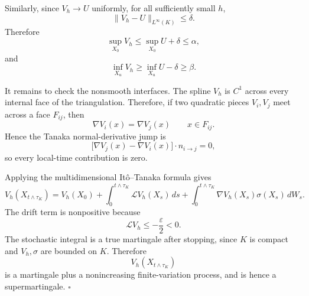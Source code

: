 Similarly, since \(V_h\to U\) uniformly, for all sufficiently small \(h\),
\[
  \|V_h-U\|_{L^\infty(K)}\le\delta.
\]
Therefore
\[
  \sup_{X_0}V_h
  \le
  \sup_{X_0}U+\delta
  \le
  \alpha,
\]
and
\[
  \inf_{X_u}V_h
  \ge
  \inf_{X_u}U-\delta
  \ge
  \beta.
\]

It remains to check the nonsmooth interfaces.  The spline \(V_h\) is
\(C^1\) across every internal face of the triangulation.  Therefore, if two
quadratic pieces \(V_i,V_j\) meet across a face \(F_{ij}\), then
\[
  \nabla V_i(x)=\nabla V_j(x)
  \qquad x\in F_{ij}.
\]
Hence the Tanaka normal-derivative jump is
\[
  \bigl[\nabla V_j(x)-\nabla V_i(x)\bigr]\cdot n_{i\to j}=0,
\]
so every local-time contribution is zero.

Applying the multidimensional It\^o--Tanaka formula gives
\[
  V_h(X_{t\wedge\tau_K})
  =
  V_h(X_0)
  +
  \int_0^{t\wedge\tau_K}\mathcal LV_h(X_s)\,ds
  +
  \int_0^{t\wedge\tau_K}\nabla V_h(X_s)\sigma(X_s)\,dW_s.
\]
The drift term is nonpositive because
\[
  \mathcal LV_h\le-\frac{\varepsilon}{2}<0.
\]
The stochastic integral is a true martingale after stopping, since \(K\) is
compact and \(V_h,\sigma\) are bounded on \(K\).  Therefore
\[
  V_h(X_{t\wedge\tau_K})
\]
is a martingale plus a nonincreasing finite-variation process, and is hence a
supermartingale. \(\square\)
